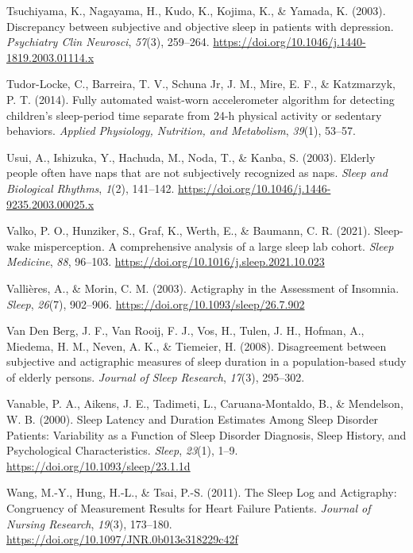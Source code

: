 \documentclass[
]{article}
\newlength{\cslhangindent}
\newenvironment{CSLReferences}[2] %
 {\begin{list}{}{%
  \setlength{\itemindent}{0pt}
  \setlength{\leftmargin}{0pt}
  \setlength{\parsep}{0pt}
  \ifodd #1
   \setlength{\leftmargin}{\cslhangindent}
   \setlength{\itemindent}{-1\cslhangindent}
  \fi
  \setlength{\itemsep}{#2\baselineskip}}}
 {\end{list}}
\begin{document}
\begin{CSLReferences}{1}{0}
Tsuchiyama, K., Nagayama, H., Kudo, K., Kojima, K., \& Yamada, K. (2003). Discrepancy between subjective and objective sleep in patients with depression. \emph{Psychiatry Clin Neurosci}, \emph{57}(3), 259--264. \url{https://doi.org/10.1046/j.1440-1819.2003.01114.x}

Tudor-Locke, C., Barreira, T. V., Schuna Jr, J. M., Mire, E. F., \& Katzmarzyk, P. T. (2014). Fully automated waist-worn accelerometer algorithm for detecting children's sleep-period time separate from 24-h physical activity or sedentary behaviors. \emph{Applied Physiology, Nutrition, and Metabolism}, \emph{39}(1), 53--57.

Usui, A., Ishizuka, Y., Hachuda, M., Noda, T., \& Kanba, S. (2003). Elderly people often have naps that are not subjectively recognized as naps. \emph{Sleep and Biological Rhythms}, \emph{1}(2), 141--142. \url{https://doi.org/10.1046/j.1446-9235.2003.00025.x}

Valko, P. O., Hunziker, S., Graf, K., Werth, E., \& Baumann, C. R. (2021). Sleep-wake misperception. {A} comprehensive analysis of a large sleep lab cohort. \emph{Sleep Medicine}, \emph{88}, 96--103. \url{https://doi.org/10.1016/j.sleep.2021.10.023}

Vallières, A., \& Morin, C. M. (2003). Actigraphy in the {Assessment} of {Insomnia}. \emph{Sleep}, \emph{26}(7), 902--906. \url{https://doi.org/10.1093/sleep/26.7.902}

Van Den Berg, J. F., Van Rooij, F. J., Vos, H., Tulen, J. H., Hofman, A., Miedema, H. M., Neven, A. K., \& Tiemeier, H. (2008). Disagreement between subjective and actigraphic measures of sleep duration in a population-based study of elderly persons. \emph{Journal of Sleep Research}, \emph{17}(3), 295--302.

Vanable, P. A., Aikens, J. E., Tadimeti, L., Caruana-Montaldo, B., \& Mendelson, W. B. (2000). Sleep {Latency} and {Duration} {Estimates} {Among} {Sleep} {Disorder} {Patients}: {Variability} as a {Function} of {Sleep} {Disorder} {Diagnosis}, {Sleep} {History}, and {Psychological} {Characteristics}. \emph{Sleep}, \emph{23}(1), 1--9. \url{https://doi.org/10.1093/sleep/23.1.1d}

Wang, M.-Y., Hung, H.-L., \& Tsai, P.-S. (2011). The {Sleep} {Log} and {Actigraphy}: {Congruency} of {Measurement} {Results} for {Heart} {Failure} {Patients}. \emph{Journal of Nursing Research}, \emph{19}(3), 173--180. \url{https://doi.org/10.1097/JNR.0b013e318229c42f}


\end{CSLReferences}
\end{document}
